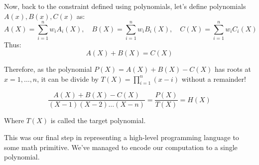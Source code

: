 \documentclass[../lecture-notes.tex]{subfiles}
\begin{document}
Now, back to the constraint defined using polynomials, let's define polynomials $A(x), B(x), C(x)$ 
as:
\begin{equation*}
    A(X) = \sum_{i = 1}^{n} w_iA_i(X), \quad B(X) = \sum_{i = 1}^{n} w_iB_i(X), \quad C(X) = \sum_{i = 1}^{n} w_iC_i(X)
\end{equation*}
Thus:
\begin{equation*}
    A(X) + B(X) = C(X)
\end{equation*}

Therefore, as the polynomial $P(X) = A(X) + B(X) - C(X)$ has roots at $x = 1,\dots,n$, it can be
divide by $T(X) = \prod_{i=1}^{n}(x-i)$ without a remainder!

\begin{equation*}
    \frac{A(X) + B(X) - C(X)}{(X-1)(X-2)\dots(X-n)} = \frac{P(X)}{T(X)} = H(X)
\end{equation*}

Where $T(X)$ is called the target polynomial.

This was our final step in representing a high-level programming language to some math primitive.
We've managed to encode our computation to a single polynomial.
\end{document}
